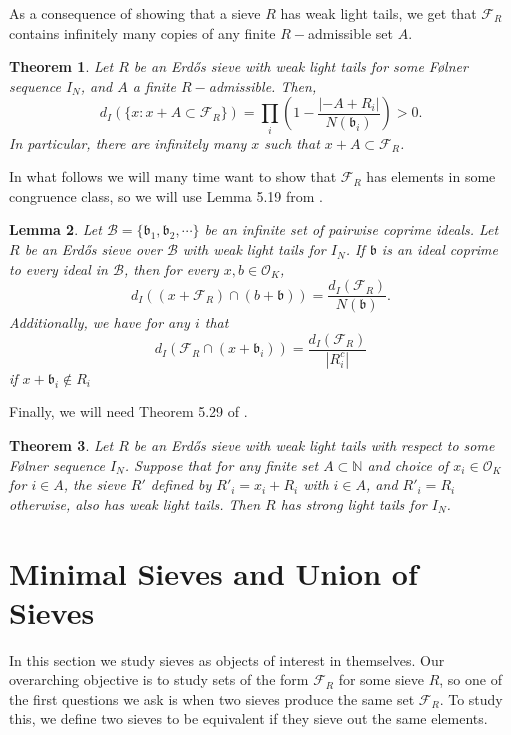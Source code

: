\documentclass[a4paper,11pt,reqno]{amsart}
\theoremstyle{plain}
\newtheorem{theorem}{Theorem}[section]
\newtheorem{lemma}[theorem]{Lemma}
\theoremstyle{remark}
\newcommand{\co}{\mathcal{O}}
\newcommand{\fr}{\mathcal{F}_R}
\newcommand{\gb}{\mathfrak{b}}
\begin{document}
As a consequence of showing that a sieve $R$ has weak light tails, we get that $\fr$ contains infinitely many copies of any finite $R-$admissible set $A$.

\begin{theorem}
	\label{thm: density of x+A in fr}
	Let $R$ be an Erdős sieve with weak light tails for some Følner sequence $I_N$, and $A$ a finite $R-$admissible. Then,
	$$d_I(\{x: x+A \subset \fr\}) = \prod_{i} \left(1-\frac{|-A+R_i|}{N(\gb_i)}\right)>0.$$ In particular, there are infinitely many $x$ such that $x+A \subset \fr$.
\end{theorem} 

In what follows we will many time want to show that $\fr$ has elements in some congruence class, so we will use Lemma 5.19 from \cite{part1}.

\begin{lemma}
	\label{lm: Fr intercepted by ideal}
	Let $\mathcal{B} = \{\gb_1, \gb_2, \cdots\}$ be an infinite set of pairwise coprime ideals. Let $R$ be an Erdős sieve over $\mathcal{B}$ with weak light tails for $I_N$. If $\gb$ is an ideal coprime to every ideal in $\mathcal{B}$, then for every $x,b \in \co_K$, $$d_I((x+\fr) \cap (b+\gb)) = \frac{d_I(\fr)}{N(\gb)}.$$
	Additionally, we have for any $i$ that  $$d_I(\fr \cap(x+\gb_i))  = \frac{d_I(\fr)}{|R_i^c|}$$ if $x + \gb_i \not \in R_i $ 
\end{lemma}


Finally, we will need Theorem 5.29 of \cite{part1}.

	\begin{theorem}
	\label{thm: R has strong light tails if finite translations}
	Let $R$ be an Erdős sieve with weak light tails with respect to some Følner sequence $I_N$. Suppose that for any finite set $A \subset \mathbb{N}$ and choice of $x_i \in \co_K$ for $i \in A$, the sieve $R'$ defined by $R'_i = x_i + R_i$ with $i \in A $, and $R'_i = R_i$ otherwise, also has weak light tails. Then $R$ has strong light tails for $I_N$.
\end{theorem}
 
		
		
		
		\section{Minimal Sieves and Union of Sieves}
		
		
		In this section we study sieves as objects of interest in themselves. Our overarching objective is to study sets of the form $\fr$ for some sieve $R$, so one of the first questions we ask is when two sieves produce the same set $\fr$.  To study this, we define two sieves to be equivalent if they sieve out the same elements.
		
\end{document}
